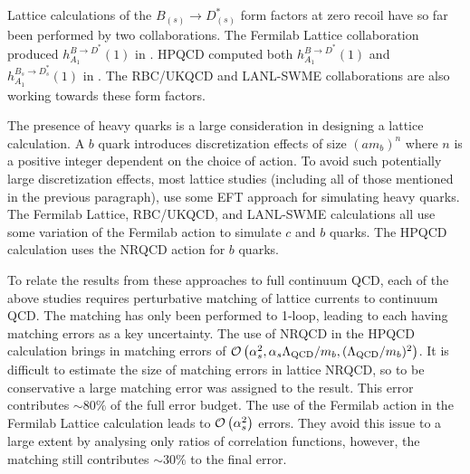 Lattice calculations of the $B_{(s)} \to D_{(s)}^*$ form factors at zero recoil have so far been performed by two collaborations. The Fermilab Lattice collaboration produced $h_{A_1}^{B\to D^*}(1)$ in \cite{Bailey:2014tva}. HPQCD computed both $h_{A_1}^{B\to D^*}(1)$ and $h_{A_1}^{B_{s}\to D_{s}^*}(1)$ in \cite{Harrison:2017fmw}. The RBC/UKQCD \cite{Flynn:2016vej} and LANL-SWME \cite{Bailey:2017xjk} collaborations are also working towards these form factors.


The presence of heavy quarks is a large consideration in designing a lattice calculation. A $b$ quark introduces discretization effects of size $(am_b)^n$ where $n$ is a positive integer dependent on the choice of action. To avoid such potentially large discretization effects, most lattice studies (including all of those mentioned in the previous paragraph), use some EFT approach for simulating heavy quarks. The Fermilab Lattice, RBC/UKQCD, and LANL-SWME calculations all use some variation of the Fermilab action \cite{Wilson:1977xx,SHEIKHOLESLAMI1985572,ElKhadra:1996mp} to simulate $c$ and $b$ quarks. The HPQCD calculation uses the NRQCD action \cite{Lepage:1992tx} for $b$ quarks. 

To relate the results from these approaches to full continuum QCD, each of the above studies requires perturbative matching of lattice currents to continuum QCD. The matching has only been performed to 1-loop, leading to each having matching errors as a key uncertainty. The use of NRQCD in the HPQCD calculation brings in matching errors of $\mathcal{O}\left( \alpha_s^2,\alpha_s \Lambda_{\text{QCD}} / m_b, (\Lambda_{\text{QCD}} / m_b )^2 \right)$. It is difficult to estimate the size of matching errors in lattice NRQCD, so to be conservative a large matching error was assigned to the result. This error contributes $\sim 80\%$ of the full error budget. The use of the Fermilab action in the Fermilab Lattice calculation leads to $\mathcal{O}\left( \alpha_s^2 \right)$ errors. They avoid this issue to a large extent by analysing only ratios of correlation functions, however, the matching still contributes $\sim 30\%$ to the final error. %

